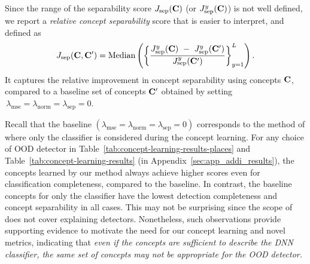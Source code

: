 \fi

Since the range of the separability score $J_{\textrm{sep}}(\mathbf{C})$ (or $J^y_{\textrm{sep}}(\mathbf{C})$) is not well defined, we report a \textit{relative concept separability} score that is easier to interpret, and defined as
\begin{equation}
\label{eq:relative-separability}
J_{\textrm{sep}}(\mathbf{C}, \mathbf{C}') = \textrm{Median}\left( \left\{\frac{J^y_{\textrm{sep}}(\mathbf{C}) ~-~ J^y_{\textrm{sep}}(\mathbf{C}')}{J^y_{\textrm{sep}}(\mathbf{C}')}\right\}_{y=1}^L \right). 
\end{equation}
It captures the relative improvement in concept separability using concepts $\mathbf{C}$, compared to a baseline set of concepts $\mathbf{C}'$ obtained by setting $\,\lambda_\textrm{mse} = \lambda_\textrm{norm} = \lambda_\textrm{sep} = 0$.
%

Recall that the baseline $(\lambda_\textrm{mse} = \lambda_\textrm{norm} = \lambda_\textrm{sep} = 0)$ corresponds to the method of \citet{yeh2020completeness} where only the classifier is considered during the concept learning.
For any choice of OOD detector in Table~\ref{tab:concept-learning-results-places} and Table~\ref{tab:concept-learning-results} (in Appendix~\ref{sec:app_addi_results}), the concepts learned by our method always achieve higher scores even for classification completeness, compared to the baseline. 
In contrast, the baseline concepts for only the classifier have the lowest detection completeness and concept separability in all cases.
This may not be surprising since the scope of~\citet{yeh2020completeness} does not cover explaining detectors.
Nonetheless, such observations provide supporting evidence to motivate the need for our concept learning and novel metrics, indicating that {\em even if the concepts are sufficient to describe the DNN classifier, the same set of concepts may not be appropriate for the OOD detector.}

%
%

